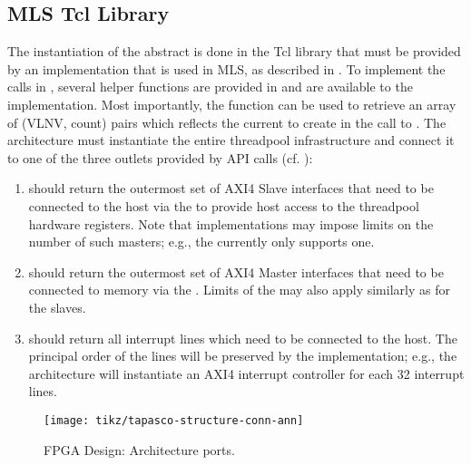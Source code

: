 \subsection{MLS Tcl Library}\label{sec:ai-mls}%
The instantiation of the abstract  is done in the Tcl library that must be provided by an  implementation that is used in MLS, as described in .
To implement the calls in , several helper functions are provided in  and are available to the implementation.
Most importantly, the  function can be used to retrieve an array of (VLNV, count) pairs which reflects the current  to create in the call to .
The architecture must instantiate the entire threadpool infrastructure and connect it to one of the three outlets provided by API calls (cf. ):
%
\begin{enumerate}
  \item {} should return the outermost set of AXI4 Slave interfaces that need to be connected to the host via the  to provide host access to the threadpool hardware registers. Note that  implementations may impose limits on the number of such masters; e.g., the   currently only supports one.
  \item {} should return the outermost set of AXI4 Master interfaces that need to be connected to memory via the . Limits of the  may also apply similarly as for the slaves.
  \item {} should return all interrupt lines which need to be connected to the host. The principal order of the lines will be preserved by the  implementation; e.g., the  architecture will instantiate an AXI4 interrupt controller for each 32 interrupt lines.
\end{enumerate}
%
\begin{figure}
  \centering%
  \texttt{[image: tikz/tapasco-structure-conn-ann]}
  \caption{FPGA Design: Architecture ports.}
  \label{fig:arch-ports}
\end{figure}

